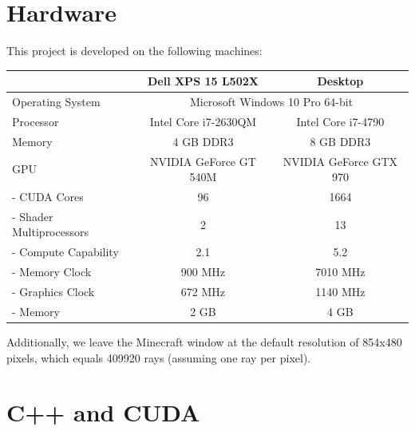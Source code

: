 \documentclass[]{article}
\begin{document}
\section{Hardware}
This project is developed on the following machines:

\begin{center}
  \begin{tabular}{| l || c | c |} \hline
    & Dell XPS 15 L502X & Desktop \\ \hline
    Operating System & \multicolumn{2}{c|}{Microsoft Windows 10 Pro 64-bit} \\ \hline
    Processor & Intel Core i7-2630QM & Intel Core i7-4790 \\ \hline
    Memory & 4 GB DDR3 & 8 GB DDR3 \\ \hline \hline
    GPU & NVIDIA GeForce GT 540M & NVIDIA GeForce GTX 970\\ \hline
    - CUDA Cores & 96 & 1664 \\ \hline
    - Shader Multiprocessors & 2 & 13 \\ \hline
    - Compute Capability & 2.1 & 5.2 \\ \hline
    - Memory Clock & 900 MHz & 7010 MHz \\ \hline
    - Graphics Clock & 672 MHz & 1140 MHz \\ \hline
    - Memory & 2 GB & 4 GB \\ \hline %
  \end{tabular}
\end{center}

Additionally, we leave the Minecraft window at the default resolution of 854x480 pixels, which equals 409920 rays (assuming one ray per pixel).

\section{C++ and CUDA}

\end{document}
